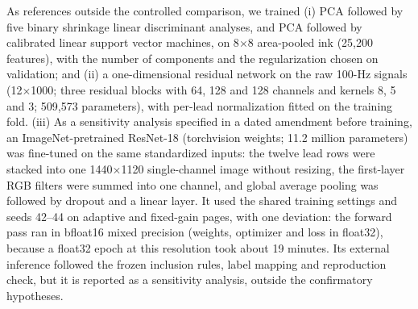 \documentclass[journal]{IEEEtran}
\begin{document}
As references outside the controlled comparison, we trained (i) PCA followed by five binary shrinkage linear discriminant analyses, and PCA followed by calibrated linear support vector machines, on 8$\times$8 area-pooled ink (25{,}200 features), with the number of components and the regularization chosen on validation; and (ii) a one-dimensional residual network \cite{wang2017timeseries,he2016resnet} on the raw 100-Hz signals (12$\times$1000; three residual blocks with 64, 128 and 128 channels and kernels 8, 5 and 3; 509{,}573 parameters), with per-lead normalization fitted on the training fold. (iii) As a sensitivity analysis specified in a dated amendment before training, an ImageNet-pretrained ResNet-18 \cite{he2016resnet} (torchvision weights; 11.2 million parameters) was fine-tuned on the same standardized inputs: the twelve lead rows were stacked into one 1440$\times$1120 single-channel image without resizing, the first-layer RGB filters were summed into one channel, and global average pooling was followed by dropout and a linear layer. It used the shared training settings and seeds 42--44 on adaptive and fixed-gain pages, with one deviation: the forward pass ran in bfloat16 mixed precision (weights, optimizer and loss in float32), because a float32 epoch at this resolution took about 19 minutes. Its external inference followed the frozen inclusion rules, label mapping and reproduction check, but it is reported as a sensitivity analysis, outside the confirmatory hypotheses.
\end{document}
